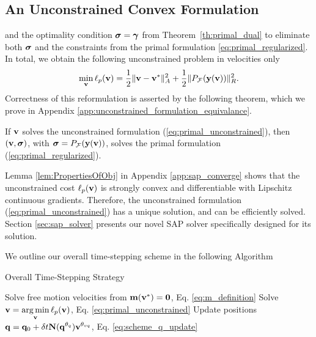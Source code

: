 

\subsection{An Unconstrained Convex Formulation}
\label{sec:unconstrained_convex_formulation}

 and the optimality condition ${\bm{\sigma}}
= {\bm\gamma}$ from Theorem~\ref{th:primal_dual} to eliminate both ${\bm{\sigma}}$ and
the constraints from the primal formulation \eqref{eq:primal_regularized}. In
total, we obtain the following unconstrained problem in velocities only
\begin{eqnarray}
	\min_{\mf{v}} \ell_p(\mf{v}) = \frac{1}{2}\Vert\mf{v}-\mf{v}^*\Vert_{A}^2 +
	\frac{1}{2}\Vert P_\mathcal{F}(\mf{y}(\mf{v}))\Vert_R^2.
	\label{eq:primal_unconstrained}
\end{eqnarray}
Correctness of this reformulation is asserted by the following theorem, which we
prove in Appendix \ref{app:unconstrained_formulation_equivalance}.
\begin{theorem}
  If  ${\mathbf{v}}$ solves the unconstrained formulation
    (\ref{eq:primal_unconstrained}), then $({\mathbf{v}}, {\bm\sigma})$, with ${\bm\sigma}
    =P_\mathcal{F}({\mathbf{y}}({\mathbf{v}}))$, solves the primal formulation
    (\ref{eq:primal_regularized}).
    \label{th:unconstrained_formulation_equivalance}
\end{theorem}
Lemma \ref{lem:PropertiesOfObj} in Appendix \ref{app:sap_converge} shows that
the unconstrained cost $\ell_p({\mathbf{v}})$ is strongly convex and differentiable
with Lipschitz continuous gradients. Therefore, the unconstrained formulation
(\ref{eq:primal_unconstrained}) has a unique solution, and can be efficiently
solved.  
Section \ref{sec:sap_solver} presents our novel SAP solver specifically designed
for its solution.

We outline our overall time-stepping scheme in the following Algorithm
\begin{algorithm}[H]
	\caption{Overall Time-Stepping Strategy}
	  \label{alg:sap_time_stepping}
	  \begin{algorithmic}[1]
		  \State Solve free motion velocities from
		  ${\mathbf{m}}({\mathbf{v}}^*)={\mathbf{0}}$, Eq. \eqref{eq:m_definition}
		  \State Solve $\displaystyle {\mathbf{v}} = \operatorname*{arg\,min}_{{\mathbf{v}}} \ell_p({\mathbf{v}})$, Eq. \eqref{eq:primal_unconstrained}
		  \State Update positions $\displaystyle {\mathbf{q}} = {\mathbf{q}}_0 + \delta
		  t{\mathbf{N}}({\mathbf{q}}^{\theta_{q}}){\mathbf{v}}^{\theta_{vq}}$, Eq. \eqref{eq:scheme_q_update}
	  \end{algorithmic}
\end{algorithm}

